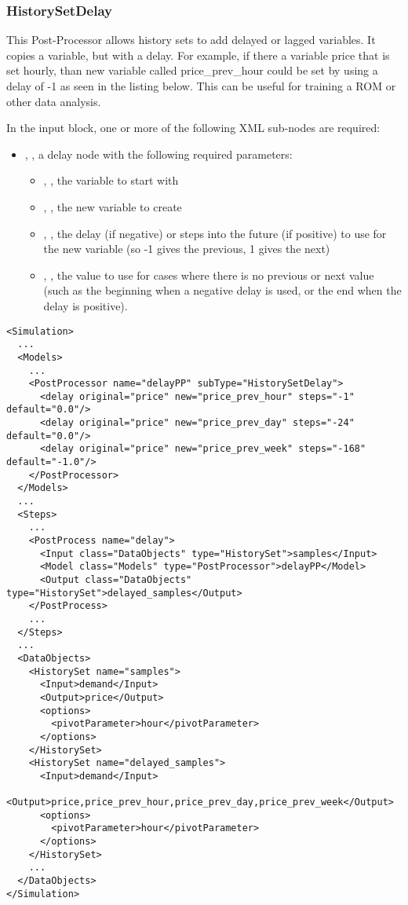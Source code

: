 \subsubsection{HistorySetDelay}
\label{HistorySetDelay}

This Post-Processor allows history sets to add delayed or lagged
variables. It copies a variable, but with a delay. For example, if
there a variable price that is set hourly, than new variable called
price\_prev\_hour could be set by using a delay of -1 as seen in the
listing below.  This can be useful for training a ROM or other data
analysis.


In the  input block, one or more of the following XML sub-nodes are required:

\begin{itemize}
\item {}, , a delay node with the following required parameters:
  \begin{itemize}
  \item {}, , the variable to start with
  \item {}, , the new variable to create
  \item {}, , the delay (if negative) or steps into the future (if positive) to use for the new variable (so -1 gives the previous, 1 gives the next)
  \item {}, , the value to use for cases where there is no previous or next value (such as the beginning when a negative delay is used, or the end when the delay is positive).
  \end{itemize}
\end{itemize}

\begin{lstlisting}[style=XML]
<Simulation>
  ...
  <Models>
    ...
    <PostProcessor name="delayPP" subType="HistorySetDelay">
      <delay original="price" new="price_prev_hour" steps="-1" default="0.0"/>
      <delay original="price" new="price_prev_day" steps="-24" default="0.0"/>
      <delay original="price" new="price_prev_week" steps="-168" default="-1.0"/>
    </PostProcessor>
  </Models>
  ...
  <Steps>
    ...
    <PostProcess name="delay">
      <Input class="DataObjects" type="HistorySet">samples</Input>
      <Model class="Models" type="PostProcessor">delayPP</Model>
      <Output class="DataObjects" type="HistorySet">delayed_samples</Output>
    </PostProcess>
    ...
  </Steps>
  ...
  <DataObjects>
    <HistorySet name="samples">
      <Input>demand</Input>
      <Output>price</Output>
      <options>
        <pivotParameter>hour</pivotParameter>
      </options>
    </HistorySet>
    <HistorySet name="delayed_samples">
      <Input>demand</Input>
      <Output>price,price_prev_hour,price_prev_day,price_prev_week</Output>
      <options>
        <pivotParameter>hour</pivotParameter>
      </options>
    </HistorySet>
    ...
  </DataObjects>
</Simulation>
\end{lstlisting}
